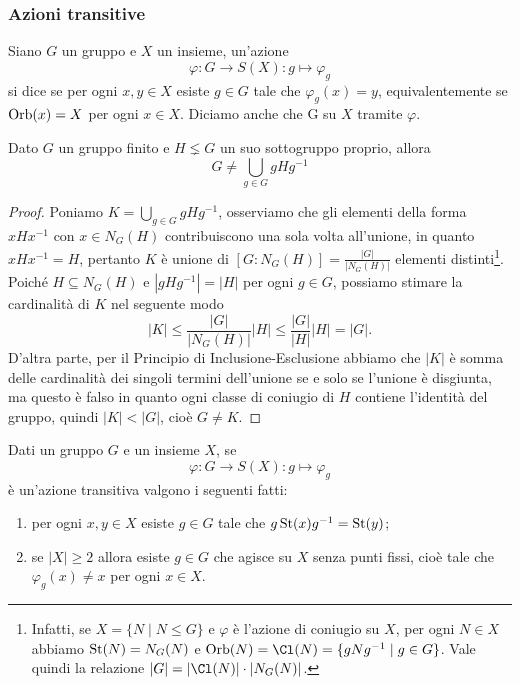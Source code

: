 \documentclass[11pt]{scrartcl}
\begin{document}
\subsubsection{Azioni transitive}

\begin{definition}
    Siano $G$ un gruppo e $X$ un insieme, un'azione \[
        \varphi:G\longrightarrow S(X) :g \longmapsto \varphi_g
    \]si dice  se per ogni $x, y \in X$ esiste $g \in G$
    tale che $\varphi_g(x) = y$, equivalentemente se $\operatorname{Orb}(x) = X$ per ogni 
    $x \in X$. Diciamo anche che G  su $X$ 
    tramite $\varphi$.
\end{definition}

\begin{lemma}
    \label{lemma1.40}
    Dato $G$ un gruppo finito e $H \lneq G$ un suo sottogruppo proprio, allora \[
        G \neq \bigcup_{g \in G}gHg^{-1}
    \]
\end{lemma}

\begin{proof}
    Poniamo $K = \displaystyle\bigcup_{g \in G}gHg^{-1}$, osserviamo che gli
    elementi della forma $xHx^{-1}$ con $x \in N_G(H)$ contribuiscono una
    sola volta all'unione, in quanto $xHx^{-1} = H$, pertanto $K$
    è unione di $[G:N_G(H)] = \displaystyle\frac{|G|}{|N_G(H)|}$ elementi distinti\footnote
    {Infatti, se $X = \{N\mid N\leqslant G\}$ e $\varphi$ è l'azione di coniugio
    su $X$, per ogni $N \in X$ abbiamo $\operatorname{St}(N) = N_G(N)$ e $\Orb(N) = \Cl(N) =
    \{gNg^{-1}\mid g \in G\}$. Vale quindi la relazione $|G| = |\Cl(N)|\cdot|N_G(N)|$.}. Poiché
    $H \subseteq N_G(H)$ e $|gHg^{-1}| = |H|$ per ogni $g \in G$, possiamo stimare 
    la cardinalità di $K$ nel seguente modo 
    \[
        |K| \leq\frac{|G|}{|N_G(H)|}|H| \leq\frac{|G|}{|H|}|H| = |G|.
    \]D'altra parte, per il Principio di Inclusione-Esclusione abbiamo che $|K|$ 
    è somma delle cardinalità dei singoli termini dell'unione se e solo se 
    l'unione è disgiunta, ma questo è falso in quanto ogni classe di coniugio
    di $H$ contiene l'identità del gruppo, quindi $|K| < |G|$, cioè $G \neq K$.
\end{proof}

\begin{proposition}
    \label{prop1.41}
    Dati un gruppo $G$ e un insieme $X$, se 
    \[
        \varphi:G\longrightarrow S(X) :g\longmapsto \varphi_g
    \]è un'azione transitiva valgono i seguenti fatti:
    \begin{enumerate}[(1)]
        \item per ogni $x, y \in X$ esiste $g \in G$ tale che $g\operatorname{St}(x)g^{-1} = \operatorname{St}(y)$;
        \item se $|X|\geqslant 2$ allora esiste $g \in G$ che agisce su $X$ senza
        punti fissi, cioè tale che $\varphi_g(x) \neq x$ per ogni $x \in X$.
    \end{enumerate}
\end{proposition}
\end{document}
